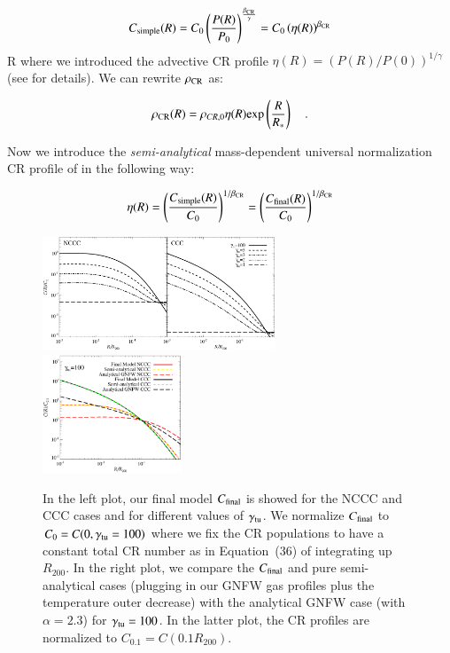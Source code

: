 \documentclass[traditabstract]{aa}
\newcommand{\rmn}{\mathrm}
\begin{document}
\begin{equation}
C_{\rm{simple}}(R)=C_{0} \left( \frac{P(R)}{P_{0}} \right)^{\frac{\beta_{\rm{CR}}}{\gamma}} = C_{0} \left( \eta(R) \right)^{\beta_{\rm{CR}}}
\label{eq:Csimple_1}
\end{equation} 
R
where we introduced the advective CR profile $\eta(R)=(P(R)/P(0))^{1/\gamma}$ (see \citealp{2011A&A...527A..99E} for details). We can rewrite $\rho_{\rm{CR}}$ as:

\begin{equation}
\rho_{\rm{CR}}(R) = \rho_{CR,0} \eta(R) \rmn{exp} \left( \frac{R}{R_{*}} \right) \quad .
\label{eg:rhoCR_1}
\end{equation} 

Now we introduce the \emph{semi-analytical} mass-dependent universal normalization CR profile of \cite{2010MNRAS.409..449P} in the following way:

\begin{equation}
\eta(R) = \left( \frac{C_{\rm{simple}}(R)}{C_0} \right)^{1/\beta_{\rm{CR}}} = \left( \frac{C_{\rm{final}}(R)}{C_0} \right)^{1/\beta_{\rm{CR}}}
\label{eq:eta}
\end{equation} 

\begin{figure}[t]
\centering
\includegraphics[width=0.62\textwidth]{figures/CR_profiles_FinalModel.eps}
\includegraphics[width=0.37\textwidth]{figures/CR_profiles_FinalModelvsREX_norm0.1.eps}
\caption{In the left plot, our final model $C_{\rm{final}}$ is showed for the NCCC and CCC cases and for different values of $\gamma_{\rm{tu}}$. We normalize $C_{\rm{final}}$ to $C_{0}=C(0,\gamma_{\rm{tu}}=100)$ where we fix the CR populations to have a constant total CR number as in Equation~(36) of \cite{2011A&A...527A..99E} integrating up $R_{200}$. In the right plot, we compare the $C_{\rm{final}}$ and pure semi-analytical cases (plugging in our GNFW gas profiles plus the temperature outer decrease) with the analytical GNFW case (with $\alpha=2.3$) for $\gamma_{\rm{tu}}=100$. In the latter plot, the CR profiles are normalized to $C_{0.1}=C(0.1R_{200})$.}
\label{fig:CRFinalModel}
\end{figure}
\end{document}

